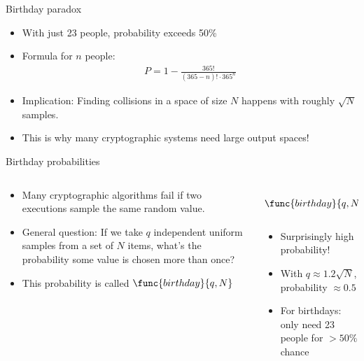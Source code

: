 \documentclass[aspectratio=169, lualatex, handout]{beamer}
\begin{document}
\begin{frame}{Birthday paradox}
	\begin{itemize}[<+->]
		\item With just 23 people, probability exceeds 50\%
		\item Formula for $n$ people:
		      \begin{align*}
			      P = 1 - \frac{365!}{(365-n)! \cdot 365^n}
		      \end{align*}
		\item Implication: Finding collisions in a space of size $N$ happens with roughly $\sqrt{N}$ samples.
		\item This is why many cryptographic systems need large output spaces!
	\end{itemize}
\end{frame}

\begin{frame}{Birthday probabilities}
	\begin{columns}[c]
		\begin{column}{0.6\textwidth}
			\begin{itemize}[<+->]
				\item Many cryptographic algorithms fail if two executions sample the same random value.
				\item General question: If we take $q$ independent uniform samples from a set of $N$ items, what's the probability some value is chosen more than once?
				\item This probability is called $\func{birthday}{q,N}$
			\end{itemize}
		\end{column}
		\begin{column}{0.4\textwidth}
			\begin{align*}
				\func{birthday}{q,N} = 1 - \prod_{i=1}^{q-1} \left(1 - \frac{i}{N}\right)
			\end{align*}
			\begin{itemize}[<+->]
				\item Surprisingly high probability!
				\item With $q \approx 1.2\sqrt{N}$, probability $\approx 0.5$
				\item For birthdays: only need 23 people for $>50\%$ chance
			\end{itemize}
		\end{column}
	\end{columns}
\end{frame}
\end{document}
